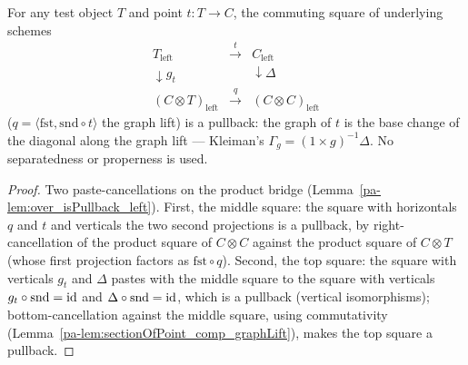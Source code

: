 \begin{theorem}
  \label{pa-thm:isPullback_graphLift}
  \leanok

  For any test object \(T\) and point \(t \colon T \to C\), the commuting square of
  underlying schemes
  \[
    \begin{array}{ccc}
      T_{\mathrm{left}} & \xrightarrow{\ t\ } & C_{\mathrm{left}} \\
      \downarrow g_t & & \downarrow \Delta \\
      (C \otimes T)_{\mathrm{left}} & \xrightarrow{\ q\ } & (C \otimes C)_{\mathrm{left}}
    \end{array}
  \]
  (\(q = \langle\mathrm{fst}, \mathrm{snd} \circ t\rangle\) the graph lift) is a pullback:
  the graph of \(t\) is the base change of the diagonal along the graph lift — Kleiman's
  \(\Gamma_g = (1 \times g)^{-1}\Delta\). No separatedness or properness is used.
\end{theorem}
\begin{proof}
  \leanok
  Two paste-cancellations on the product bridge (Lemma~\ref{pa-lem:over_isPullback_left}).
  First, the middle square: the square with horizontals \(q\) and \(t\) and verticals the
  two second projections is a pullback, by right-cancellation of the product square of
  \(C \otimes C\) against the product square of \(C \otimes T\) (whose first projection
  factors as \(\mathrm{fst} \circ q\)). Second, the top square: the square with verticals
  \(g_t\) and \(\Delta\) pastes with the middle square to the square with verticals
  \(g_t \circ \mathrm{snd} = \operatorname{id}\) and \(\Delta \circ \mathrm{snd} = \operatorname{id}\), which is a
  pullback (vertical isomorphisms); bottom-cancellation against the middle square, using
  commutativity (Lemma~\ref{pa-lem:sectionOfPoint_comp_graphLift}), makes the top square a
  pullback.
\end{proof}

